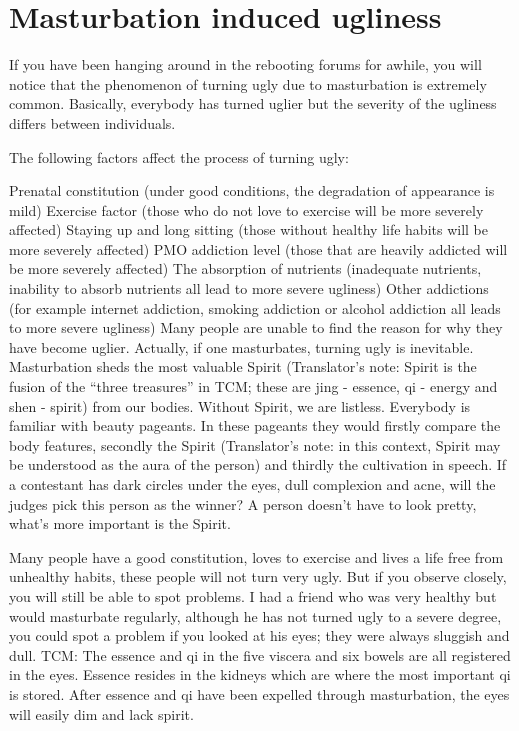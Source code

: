 \documentclass[
]{book}
\begin{document}
\hypertarget{masturbation-induced-ugliness}{%
\section{Masturbation induced ugliness}\label{masturbation-induced-ugliness}}

If you have been hanging around in the rebooting forums for awhile, you will notice that the phenomenon of turning ugly due to masturbation is extremely common. Basically, everybody has turned uglier but the severity of the ugliness differs between individuals.

The following factors affect the process of turning ugly:

Prenatal constitution (under good conditions, the degradation of appearance is mild)
Exercise factor (those who do not love to exercise will be more severely affected)
Staying up and long sitting (those without healthy life habits will be more severely affected)
PMO addiction level (those that are heavily addicted will be more severely affected)
The absorption of nutrients (inadequate nutrients, inability to absorb nutrients all lead to more severe ugliness)
Other addictions (for example internet addiction, smoking addiction or alcohol addiction all leads to more severe ugliness)
Many people are unable to find the reason for why they have become uglier. Actually, if one masturbates, turning ugly is inevitable. Masturbation sheds the most valuable Spirit (Translator's note: Spirit is the fusion of the ``three treasures'' in TCM; these are jing - essence, qi - energy and shen - spirit) from our bodies. Without Spirit, we are listless. Everybody is familiar with beauty pageants. In these pageants they would firstly compare the body features, secondly the Spirit (Translator's note: in this context, Spirit may be understood as the aura of the person) and thirdly the cultivation in speech. If a contestant has dark circles under the eyes, dull complexion and acne, will the judges pick this person as the winner? A person doesn't have to look pretty, what's more important is the Spirit.

Many people have a good constitution, loves to exercise and lives a life free from unhealthy habits, these people will not turn very ugly. But if you observe closely, you will still be able to spot problems. I had a friend who was very healthy but would masturbate regularly, although he has not turned ugly to a severe degree, you could spot a problem if you looked at his eyes; they were always sluggish and dull. TCM: The essence and qi in the five viscera and six bowels are all registered in the eyes. Essence resides in the kidneys which are where the most important qi is stored. After essence and qi have been expelled through masturbation, the eyes will easily dim and lack spirit.
\end{document}
